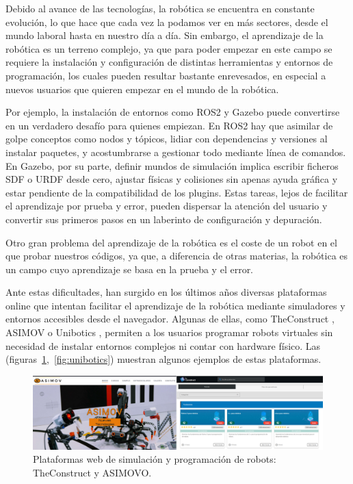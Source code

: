 \documentclass[a4paper, 12pt]{book}
\begin{document}
Debido al avance de las tecnologías, la robótica se encuentra en constante evolución, lo que hace que cada vez la podamos ver en más sectores, desde el mundo laboral hasta en nuestro día a día. Sin embargo, el aprendizaje de la robótica es un terreno complejo, ya que para poder empezar en este campo se requiere la instalación y configuración de distintas herramientas y entornos de programación, los cuales pueden resultar bastante enrevesados, en especial a nuevos usuarios que quieren empezar en el mundo de la robótica.

Por ejemplo, la instalación de entornos como ROS2 y Gazebo \cite{rico2025concise} puede convertirse en un verdadero desafío para quienes empiezan. En ROS2 hay que asimilar de golpe conceptos como nodos y tópicos, lidiar con dependencias y versiones al instalar paquetes, y acostumbrarse a gestionar todo mediante línea de comandos. En Gazebo, por su parte, definir mundos de simulación implica escribir ficheros SDF o URDF desde cero, ajustar físicas y colisiones sin apenas ayuda gráfica y estar pendiente de la compatibilidad de los plugins. Estas tareas, lejos de facilitar el aprendizaje por prueba y error, pueden dispersar la atención del usuario y convertir sus primeros pasos en un laberinto de configuración y depuración.

Otro gran problema del aprendizaje de la robótica es el coste de un robot en el que probar nuestros códigos, ya que, a diferencia de otras materias, la robótica es un campo cuyo aprendizaje se basa en la prueba y el error.

Ante estas dificultades, han surgido en los últimos años diversas plataformas online que intentan facilitar el aprendizaje de la robótica mediante simuladores y entornos accesibles desde el navegador. Algunas de ellas, como TheConstruct \cite{theConstructWebsite}, ASIMOV \cite{asimovWebsite} o Unibotics \cite{uniboticsWebsite}, permiten a los usuarios programar robots virtuales sin necesidad de instalar entornos complejos ni contar con hardware físico. Las (figuras~\ref{fig:plataformas_robotica},~\ref{fig:unibotics}) muestran algunos ejemplos de estas plataformas.

\begin{figure}[H]
    \centering
    \includegraphics[width=1.1\textwidth]{img/roboticas.png}
    \caption{Plataformas web de simulación y programación de robots: TheConstruct y ASIMOVO.}
    \label{fig:plataformas_robotica}
\end{figure}
\end{document}
